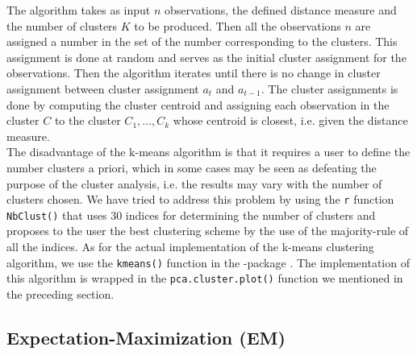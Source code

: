 \documentclass[../thesis.tex]{subfiles}
\begin{document}
\newpage
\noindent The algorithm takes as input $n$ observations, the defined distance measure and the number of clusters $K$ to be produced. Then all the observations $n$ are assigned a number in the set of the number corresponding to the clusters. This assignment is done at random and serves as the initial cluster assignment for the observations. Then the algorithm iterates until there is no change in cluster assignment between cluster assignment $a_t$ and $a_{t-1}$. The cluster assignments is done by computing the cluster centroid and assigning each observation in the cluster $C$ to the cluster $C_1, \hdots, C_k$ whose centroid is closest, i.e. given the distance measure. \\
\indent The disadvantage of the k-means algorithm is that it requires a user to define the number clusters a priori, which in some cases may be seen as defeating the purpose of the cluster analysis, i.e. the results may vary with the number of clusters chosen. We have tried to address this problem by using the \texttt{r} function \texttt{NbClust()} \citep{nbclust} that uses 30 indices for determining the number of clusters and proposes to the user the best clustering scheme by the use of the majority-rule of all the indices. As for the actual implementation of the k-means clustering algorithm, we use the \texttt{kmeans()} function in the -package \citep{stats}. The implementation of this algorithm is wrapped in the \texttt{pca.cluster.plot()} function we mentioned in the preceding section.

\vspace*{-0,25cm}\subsection{Expectation-Maximization (EM)}
\label{subsec:em}
\end{document}
